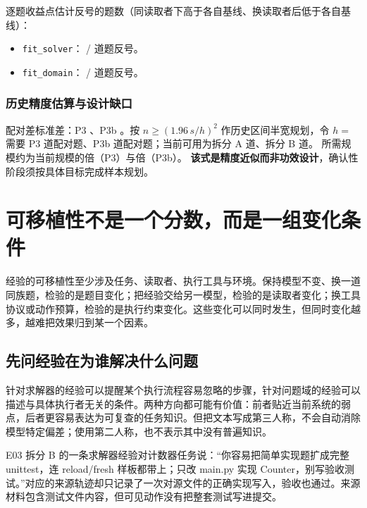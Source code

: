 逐题收益点估计反号的题数（同读取者下高于各自基线、换读取者后低于各自基线）：

\begin{itemize}
  \item \texttt{fit\_solver}： /  道题反号。
  \item \texttt{fit\_domain}： /  道题反号。
\end{itemize}

\subsubsection{历史精度估算与设计缺口}

\begin{sloppypar}
配对差标准差：P3 、P3b 。按 $n\ge(1.96\,s/h)^{2}$ 作历史区间半宽规划，令 $h=$  需要 P3  道配对题、P3b  道配对题；当前可用为拆分 A  道、拆分 B  道。
所需规模约为当前规模的倍（P3）与倍（P3b）。
\textbf{该式是精度近似而非功效设计}，确认性阶段须按具体目标完成样本规划。
\end{sloppypar}


\section{可移植性不是一个分数，而是一组变化条件}
\label{sec:ch05-portability}

经验的可移植性至少涉及任务、读取者、执行工具与环境。保持模型不变、换一道同族题，检验的是题目变化；把经验交给另一模型，检验的是读取者变化；换工具协议或动作预算，检验的是执行约束变化。这些变化可以同时发生，但同时变化越多，越难把效果归到某一个因素。

\subsection{先问经验在为谁解决什么问题}

针对求解器的经验可以提醒某个执行流程容易忽略的步骤，针对问题域的经验可以描述与具体执行者无关的条件。两种方向都可能有价值：前者贴近当前系统的弱点，后者更容易表达为可复查的任务知识。但把文本写成第三人称，不会自动消除模型特定偏差；使用第二人称，也不表示其中没有普遍知识。

E03 拆分 B 的一条求解器经验对计数器任务说：“你容易把简单实现题扩成完整 unittest，连 reload/fresh 样板都带上；只改 main.py 实现 Counter，别写验收测试。”对应的来源轨迹却只记录了一次对源文件的正确实现写入，验收也通过。来源材料包含测试文件内容，但可见动作没有把整套测试写进提交。

